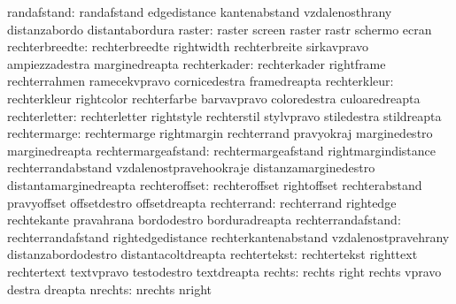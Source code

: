               randafstand: randafstand               edgedistance
                           kantenabstand             vzdalenosthrany
                           distanzabordo             distantabordura
                   raster: raster                    screen
                           raster                    rastr
                           schermo                   ecran
           rechterbreedte: rechterbreedte            rightwidth
                           rechterbreite             sirkavpravo
                           ampiezzadestra            marginedreapta
             rechterkader: rechterkader              rightframe
                           rechterrahmen             ramecekvpravo
                           cornicedestra             framedreapta
             rechterkleur: rechterkleur              rightcolor
                           rechterfarbe              barvavpravo
                           coloredestra              culoaredreapta
            rechterletter: rechterletter             rightstyle
                           rechterstil               stylvpravo
                           stiledestra               stildreapta
             rechtermarge: rechtermarge              rightmargin
                           rechterrand               pravyokraj
                           marginedestro             marginedreapta
      rechtermargeafstand: rechtermargeafstand       rightmargindistance
                           rechterrandabstand        vzdalenostpravehookraje
                           distanzamarginedestro     distantamarginedreapta
            rechteroffset: rechteroffset             rightoffset
                           rechterabstand            pravyoffset
                           offsetdestro              offsetdreapta
              rechterrand: rechterrand               rightedge
                           rechtekante               pravahrana
                           bordodestro               borduradreapta
       rechterrandafstand: rechterrandafstand        rightedgedistance
                           rechterkantenabstand      vzdalenostpravehrany
                           distanzabordodestro       distantacoltdreapta
             rechtertekst: rechtertekst              righttext
                           rechtertext               textvpravo
                           testodestro               textdreapta %
                   rechts: rechts                    right
                           rechts                    vpravo
                           destra                    dreapta
                  nrechts: nrechts                   nright
